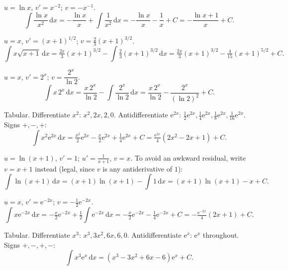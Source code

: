 \begin{solutions}
  \item $u=\ln x$, $v'=x^{-2}$; $v=-x^{-1}$.
        \[
          \int \frac{\ln x}{x^{2}}\,\mathrm{d}x
            = -\frac{\ln x}{x}+\int \frac{1}{x^{2}}\,\mathrm{d}x
            = -\frac{\ln x}{x}-\frac1x+C
            = -\frac{\ln x+1}{x}+C .
        \]

  \item $u=x$, $v'=(x+1)^{1/2}$; $v=\tfrac23(x+1)^{3/2}$.
        \[
          \int x\sqrt{x+1}\,\mathrm{d}x
            = \tfrac{2x}{3}(x+1)^{3/2}-\int \tfrac23(x+1)^{3/2}\,\mathrm{d}x
            = \tfrac{2x}{3}(x+1)^{3/2}-\tfrac{4}{15}(x+1)^{5/2}+C .
        \]

  \item $u=x$, $v'=2^{x}$; $v=\dfrac{2^{x}}{\ln 2}$.
        \[
          \int x\,2^{x}\,\mathrm{d}x
            = \frac{x\,2^{x}}{\ln 2}-\int \frac{2^{x}}{\ln 2}\,\mathrm{d}x
            = \frac{x\,2^{x}}{\ln 2}-\frac{2^{x}}{(\ln 2)^{2}}+C .
        \]

  \item Tabular. Differentiate $x^{2}$: $x^{2},2x,2,0$. Antidifferentiate
        $\mathrm{e}^{2x}$: $\tfrac12\mathrm{e}^{2x},\tfrac14\mathrm{e}^{2x},
        \tfrac18\mathrm{e}^{2x},\tfrac{1}{16}\mathrm{e}^{2x}$. Signs $+,-,+$:
        \[
          \int x^{2}\mathrm{e}^{2x}\,\mathrm{d}x
            = \tfrac{x^{2}}{2}\mathrm{e}^{2x}-\tfrac{x}{2}\mathrm{e}^{2x}
              +\tfrac14\mathrm{e}^{2x}+C
            = \tfrac{\mathrm{e}^{2x}}{4}(2x^{2}-2x+1)+C .
        \]

  \item $u=\ln(x+1)$, $v'=1$; $u'=\tfrac{1}{x+1}$, $v=x$. To avoid an
        awkward residual, write $v=x+1$ instead (legal, since $v$ is any
        antiderivative of $1$):
        \[
          \int \ln(x+1)\,\mathrm{d}x
            = (x+1)\ln(x+1)-\int 1\,\mathrm{d}x
            = (x+1)\ln(x+1)-x+C .
        \]

  \item $u=x$, $v'=\mathrm{e}^{-2x}$; $v=-\tfrac12\mathrm{e}^{-2x}$.
        \[
          \int x\mathrm{e}^{-2x}\,\mathrm{d}x
            = -\tfrac{x}{2}\mathrm{e}^{-2x}+\tfrac12\int \mathrm{e}^{-2x}\,\mathrm{d}x
            = -\tfrac{x}{2}\mathrm{e}^{-2x}-\tfrac14\mathrm{e}^{-2x}+C
            = -\tfrac{\mathrm{e}^{-2x}}{4}(2x+1)+C .
        \]

  \item Tabular. Differentiate $x^{3}$: $x^{3},3x^{2},6x,6,0$.
        Antidifferentiate $\mathrm{e}^{x}$: $\mathrm{e}^{x}$ throughout.
        Signs $+,-,+,-$:
        \[
          \int x^{3}\mathrm{e}^{x}\,\mathrm{d}x
            = (x^{3}-3x^{2}+6x-6)\mathrm{e}^{x}+C .
        \]


\end{solutions}
